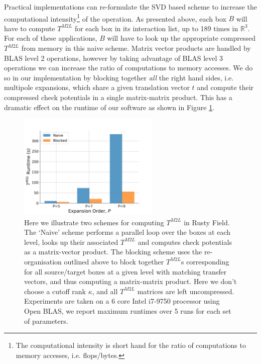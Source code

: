 Practical implementations can re-formulate the SVD based scheme to increase the computational intensity\footnote{The computational intensity is short hand for the ratio of computations to memory accesses, i.e. flops/bytes.} of the operation. As presented above, each box $B$ will have to compute $T^{M2L}$ for each box in its interaction list, up to 189 times in $\mathbb{R}^3$. For each of these applications, $B$ will have to look up the appropriate compressed $T^{M2L}$ from memory in this naive scheme. Matrix vector products are handled by BLAS level 2 operations, however by taking advantage of BLAS level 3 operations we can increase the ratio of computations to memory accesses. We do so in our implementation by blocking together \textit{all} the right hand sides, i.e. multipole expansions, which share a given translation vector $t$ and compute their compressed check potentials in a single matrix-matrix product. This has a dramatic effect on the runtime of our software as shown in Figure \ref{fig:chpt:3:sec:1:subsec:1:svd_m2l}.

\begin{figure}
    \centering
    \includegraphics[width=0.6\textwidth]{images/ch_3/svd_m2l.png}
    \caption{Here we illustrate two schemes for computing $T^{M2L}$ in Rusty Field. The `Naive' scheme performs a parallel loop over the boxes at each level, looks up their associated $T^{M2L}$ and computes check potentials as a matrix-vector product. The blocking scheme uses the re-organisation outlined above to block together $T^{M2L}$s corresponding for all source/target boxes at a given level with matching transfer vectors, and thus computing a matrix-matrix product. Here we don't choose a cutoff rank $\kappa$, and all $T^{M2L}$ matrices are left uncompressed. Experiments are taken on a 6 core Intel i7-9750 processor using Open BLAS, we report maximum runtimes over 5 runs
    for each set of parameters.}
    \label{fig:chpt:3:sec:1:subsec:1:svd_m2l}
\end{figure}


